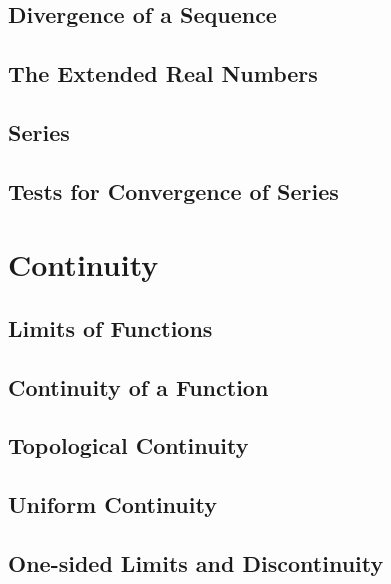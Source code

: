 \documentclass[a4paper, openany]{book}
\begin{document}
\section{Divergence of a Sequence}

\newpage

\section{The Extended Real Numbers}

\newpage

\section{Series}

\newpage

\section{Tests for Convergence of Series}

\newpage

\chapter{Continuity}
\section{Limits of Functions}

\newpage

\section{Continuity of a Function}

\newpage

\section{Topological Continuity}

\newpage

\section{Uniform Continuity}

\newpage

\section{One-sided Limits and Discontinuity}

\newpage
\end{document}
